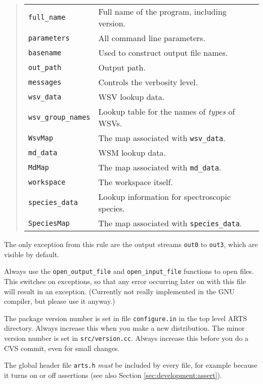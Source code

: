    \begin{quote}
   \begin{tabular}{ll}
   \verb|full_name|&         Full name of the program, including version.\\
   \verb|parameters|&        All command line parameters.\\
   \verb|basename|&          Used to construct output file names.\\
   \verb|out_path|&          Output path.\\
   \verb|messages|&          Controls the verbosity level.\\
   \verb|wsv_data|&          WSV lookup data.\\
   \verb|wsv_group_names|&   Lookup table for the names of \emph{types} of WSVs.\\
   \verb|WsvMap|&            The map associated with \verb|wsv_data|. \\
   \verb|md_data|&           WSM lookup data.\\
   \verb|MdMap|&             The map associated with \verb|md_data|. \\
   \verb|workspace|&         The workspace itself.\\
   \verb|species_data|&      Lookup information for spectroscopic species.\\
   \verb|SpeciesMap|&        The map associated with \verb|species_data|.
   \end{tabular}
   \end{quote}
   The only exception from this rule are the output streams \verb|out0| to
   \verb|out3|, which are visible by default.

Always use the \verb|open_output_file| and \verb|open_input_file|
functions to open files. This switches on exceptions, so that any
error occurring later on with this file will result in an
exception. (Currently not really implemented in the GNU compiler,
but please use it anyway.)

The package version number is set in file \verb|configure.in| in the
top level ARTS directory. Always increase this when you make a new
distribution.  The minor version number is set in
\verb|src/version.cc|. Always increase this before you do a CVS
commit, even for small changes.

The global header file \verb|arts.h| \emph{must} be included by every
file, for example because it turns on or off assertions (see also
Section \ref{sec:development:assert}).

